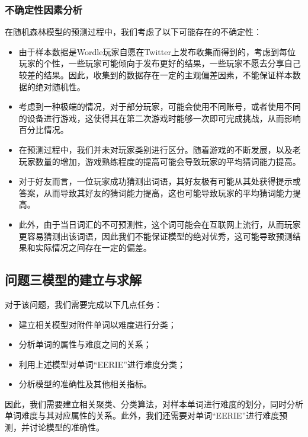 \documentclass{MathModeling}
\begin{document}
	\subsubsection{不确定性因素分析}\label{不确定性因素分析}
	在随机森林模型的预测过程中，我们考虑了以下可能存在的不确定性：
	\begin{itemize}
		\item 由于样本数据是Wordle玩家自愿在Twitter上发布收集而得到的，考虑到每位玩家的个性，一些玩家可能倾向于发布更好的结果，一些玩家不愿去分享自己较差的结果。因此，收集到的数据存在一定的主观偏差因素，不能保证样本数据的绝对随机性。
		\item 考虑到一种极端的情况，对于部分玩家，可能会使用不同账号，或者使用不同的设备进行游戏，这使得其在第二次游戏时能够一次即可完成挑战，从而影响百分比情况。
		\item 在预测过程中，我们并未对玩家类别进行区分。随着游戏的不断发展，以及老玩家数量的增加，游戏熟练程度的提高可能会导致玩家的平均猜词能力提高。
		\item 对于好友而言，一位玩家成功猜测出词语，其好友极有可能从其处获得提示或答案，从而导致其好友的猜词能力提高，这也可能导致玩家的平均猜词能力提高。
		\item 此外，由于当日词汇的不可预测性，这个词可能会在互联网上流行，从而玩家更容易猜测出该词语，因此我们不能保证模型的绝对优秀，这可能导致预测结果和实际情况之间存在一定的偏差。
	\end{itemize}
	
	\subsection{问题三模型的建立与求解}
	对于该问题，我们需要完成以下几点任务：
	\begin{itemize}
		\item 建立相关模型对附件单词以难度进行分类；
		\item 分析单词的属性与难度之间的关系；
		\item 利用上述模型对单词“EERIE”进行难度分类；
		\item 分析模型的准确性及其他相关指标。
	\end{itemize}

	因此，我们需要建立相关聚类、分类算法，对样本单词进行难度的划分，同时分析单词难度与其对应属性的关系。此外，我们还需要对单词“EERIE”进行难度预测，并讨论模型的准确性。
\end{document}
